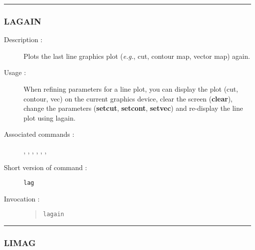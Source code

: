 \hrule 
\subsubsection*{\label{LAGAIN}LAGAIN}

\begin{description}

\item[Description :] Plots the last line graphics plot (\emph{e.g.},
cut, contour map, vector map) again.

\item[Usage :] When refining parameters for a line plot, you can
display the plot (cut, contour, vec) on the current graphics device,
clear the screen ({\bf clear}), change the parameters ({\bf setcut},
{\bf setcont}, {\bf setvec}) and re-display the line plot using
lagain.

\item[Associated commands :] {\tt {}}, 
{\tt {}}, {\tt {}}, 
{\tt {}}, {\tt {}}, 
{\tt {}}, {\tt {}}
\item[Short version of command :] {\tt lag}
\item[Invocation :]

\begin{quote}{\tt  lagain }\end{quote}

\end{description}

\hrule 
\subsubsection*{\label{LIMAG}LIMAG}

